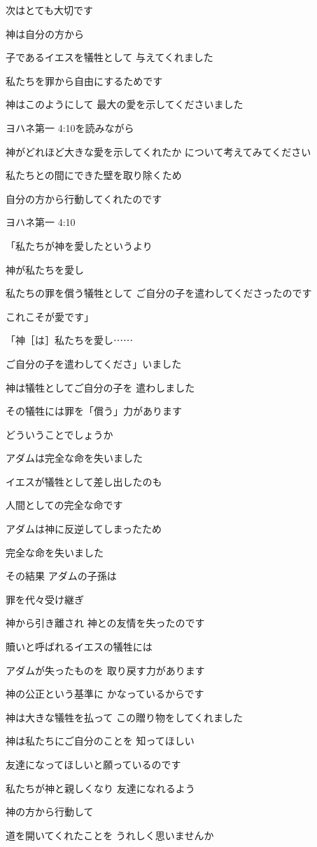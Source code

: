 \documentclass[twocolumn]{jsarticle}
\begin{document}
次はとても大切です

神は自分の方から

子であるイエスを犠牲として
与えてくれました

私たちを罪から自由にするためです

神はこのようにして
最大の愛を示してくださいました

ヨハネ第一 4:10を読みながら

神がどれほど大きな愛を示してくれたか
について考えてみてください

私たちとの間にできた壁を取り除くため

自分の方から行動してくれたのです

ヨハネ第一 4:10

「私たちが神を愛したというより

神が私たちを愛し

私たちの罪を償う犠牲として
ご自分の子を遣わしてくださったのです

これこそが愛です」

「神［は］私たちを愛し⋯⋯

ご自分の子を遣わしてくださ」いました

神は犠牲としてご自分の子を
遣わしました

その犠牲には罪を「償う」力があります

どういうことでしょうか

アダムは完全な命を失いました

イエスが犠牲として差し出したのも

人間としての完全な命です

アダムは神に反逆してしまったため

完全な命を失いました

その結果 アダムの子孫は

罪を代々受け継ぎ

神から引き離され
神との友情を失ったのです

贖いと呼ばれるイエスの犠牲には

アダムが失ったものを
取り戻す力があります

神の公正という基準に
かなっているからです

神は大きな犠牲を払って
この贈り物をしてくれました

神は私たちにご自分のことを
知ってほしい

友達になってほしいと願っているのです

私たちが神と親しくなり
友達になれるよう

神の方から行動して

道を開いてくれたことを
うれしく思いませんか
\end{document}
